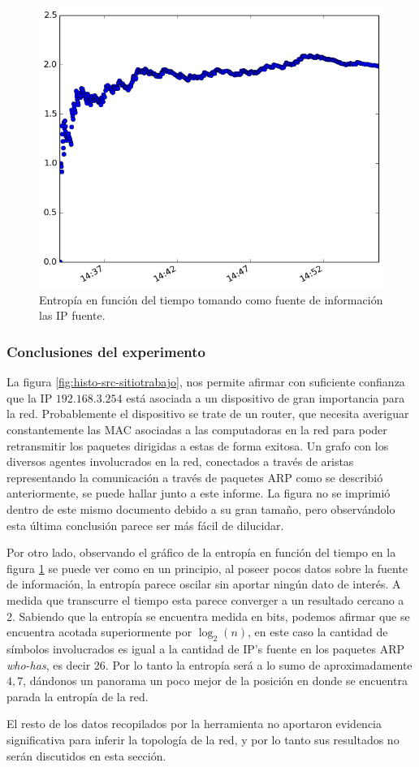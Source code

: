 \begin{figure}[H]
  \centering	
	\includegraphics[scale=0.66]{../experimentacion-agarassino/entropy_src.png}
  \caption{Entropía en función del tiempo tomando como fuente de información las IP fuente.}
	\label{fig:entropia-src-sitiotrabajo}
\end{figure}

\subsubsection{Conclusiones del experimento}
La figura \ref{fig:histo-src-sitiotrabajo}, nos permite afirmar con suficiente confianza que la IP $192.168.3.254$ está asociada a un dispositivo de gran importancia para la red. Probablemente el dispositivo se trate de un router, que necesita averiguar constantemente las MAC asociadas a las computadoras en la red para poder retransmitir los paquetes dirigidas a estas de forma exitosa. Un grafo con los diversos agentes involucrados en la red, conectados a través de aristas representando la comunicación a través de paquetes ARP como se describió anteriormente, se puede hallar junto a este informe. La figura no se imprimió dentro de este mismo documento debido a su gran tamaño, pero observándolo esta última conclusión parece ser más fácil de dilucidar. 

Por otro lado, observando el gráfico de la entropía en función del tiempo en la figura \ref{fig:entropia-src-sitiotrabajo} se puede ver como en un principio, al poseer pocos datos sobre la fuente de información, la entropía parece oscilar sin aportar ningún dato de interés. A medida que transcurre el tiempo esta parece converger a un resultado cercano a 2. Sabiendo que la entropía se encuentra medida en bits, podemos afirmar que se encuentra acotada superiormente por $\log_{2}(n)$, en este caso la cantidad de símbolos involucrados es igual a la cantidad de IP's fuente en los paquetes ARP \textit{who-has}, es decir 26.  Por lo tanto la entropía será a lo sumo de aproximadamente $4,7$, dándonos un panorama un poco mejor de la posición en donde se encuentra parada la entropía de la red.

El resto de los datos recopilados por la herramienta no aportaron evidencia significativa para inferir la topología de la red, y por lo tanto sus resultados no serán discutidos en esta sección. 